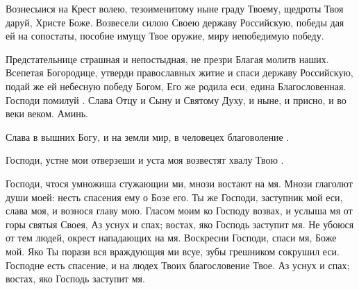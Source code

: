 \begin{mymulticols}
 Вознесыися на Крест волею, тезоименитому ныне граду Твоему, щедроты Твоя даруй, Христе Боже. Возвесели силою Своею державу Российскую, победы дая ей на сопостаты, пособие имущу Твое оружие, миру непобедимую победу.

 Предстательнице страшная и непостыдная, не презри Благая молитв наших. Всепетая Богородице, утверди православных житие и спаси державу Российскую, подай же ей небесную победу Богом, Его же родила еси, едина Благословенная. Господи помилуй . Слава Отцу и Сыну и Святому Духу, и ныне, и присно, и во веки веком. Аминь.

Слава в вышних Богу, и на земли мир, в человецех благоволение .


 Господи, устне мои отверзеши и уста моя возвестят хвалу Твою . 




Господи, чтося умножиша стужающии ми, мнози востают на мя. Мнози глаголют души моей: несть спасения ему о Бозе его. Ты же Господи, заступник мой еси, слава моя, и вознося главу мою. Гласом моим ко Господу возвах, и услыша мя от горы святыя Своея, Аз уснух и спах; востах, яко Господь заступит мя. Не убоюся от тем людей, окрест нападающих на мя. Воскресни Господи, спаси мя, Боже мой. Яко Ты порази вся враждующия ми всуе, зубы грешником сокрушил еси. Господне есть спасение, и на людех Твоих благословение Твое. Аз уснух и спах; востах, яко Господь заступит мя.





\end{mymulticols}
